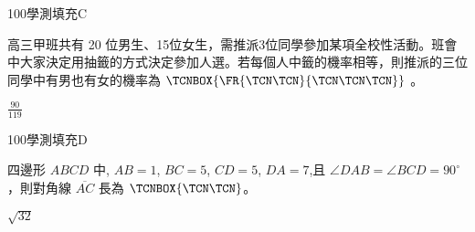     \begin{QUESTION}
        \begin{ExamInfo}{100}{學測}{填充}{C}
        \end{ExamInfo}
        \begin{ExamAnsRateInfo}{46}{82}{50}{6}
        \end{ExamAnsRateInfo}
        \begin{QBODY}
            高三甲班共有 20 位男生、15位女生，需推派3位同學參加某項全校性活動。班會中大家決定用抽籤的方式決定參加人選。若每個人中籤的機率相等，則推派的三位同學中有男也有女的機率為 $\TCNBOX{\FR{\TCN\TCN}{\TCN\TCN\TCN}}$ 。
        \end{QBODY}
        \begin{QFROMS}
        \end{QFROMS}
        \begin{QTAGS}\end{QTAGS}
        \begin{QANS}
            $\frac{90}{119}$
        \end{QANS}
        \begin{QSOLLIST}
        \end{QSOLLIST}
        \begin{QEMPTYSPACE}
        \end{QEMPTYSPACE}
    \end{QUESTION}
    \begin{QUESTION}
        \begin{ExamInfo}{100}{學測}{填充}{D}
        \end{ExamInfo}
        \begin{ExamAnsRateInfo}{32}{73}{21}{2}
        \end{ExamAnsRateInfo}
        \begin{QBODY}
            四邊形 $ABCD$ 中, $AB=1$, $BC=5$, $CD=5$, $DA=7$,且 $\angle DAB= \angle BCD=90^\circ$，則對角線 $\overline{AC}$ 長為 $\TCNBOX{\TCN\TCN}$。
        \end{QBODY}
        \begin{QFROMS}
        \end{QFROMS}
        \begin{QTAGS}\end{QTAGS}
        \begin{QANS}
            $\sqrt{32}$
        \end{QANS}
        \begin{QSOLLIST}
        \end{QSOLLIST}
        \begin{QEMPTYSPACE}
        \end{QEMPTYSPACE}
    \end{QUESTION}
